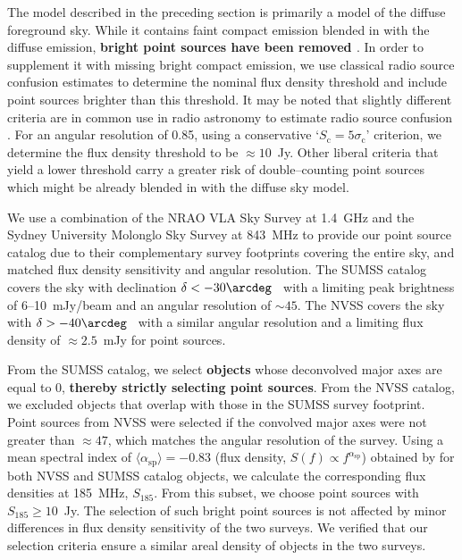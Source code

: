 \documentclass[preprint2,iop,numberedappendix]{emulateapj}
\begin{document}
The model described in the preceding section is primarily a model of the diffuse foreground sky. While it contains faint compact emission blended in with the diffuse emission, {\bf bright point sources have been removed \citep{deo08}}. In order to supplement it with missing bright compact emission, we use classical radio source confusion estimates to determine the nominal flux density threshold and include point sources brighter than this threshold. It may be noted that slightly different criteria are in common use in radio astronomy to estimate radio source confusion \citep[see Appendix of][and references therein]{thy13}. For an angular resolution of 0.85\arcdeg, using a conservative `$S_\textrm{c}=5\sigma_\textrm{c}$' criterion, we determine the flux density threshold to be $\approx 10$~Jy. Other liberal criteria that yield a lower threshold carry a greater risk of double--counting point sources which might be already blended in with the diffuse sky model. 

We use a combination of the NRAO VLA Sky Survey \citep[NVSS;][]{con98} at 1.4~GHz and the Sydney University Molonglo Sky Survey \citep[SUMSS;][]{boc99,mau03} at 843~MHz to provide our point source catalog due to their complementary survey footprints covering the entire sky, and matched flux density sensitivity and angular resolution. The SUMSS catalog covers the sky with declination $\delta < -30\arcdeg$~ with a limiting peak brightness of 6--10~mJy/beam and an angular resolution of $\sim 45$\arcsec. The NVSS covers the sky with $\delta > -40\arcdeg$~ with a similar angular resolution and a limiting flux density of $\approx 2.5$~mJy for point sources. 

From the SUMSS catalog, we select {\bf objects} whose deconvolved major axes are equal to 0\arcsec, {\bf thereby strictly selecting point sources}. From the NVSS catalog, we excluded objects that overlap with those in the SUMSS survey footprint. Point sources from NVSS were selected if the convolved major axes were not greater than $\approx 47$\arcsec, which matches the angular resolution of the survey. Using a mean spectral index of $\langle\alpha_\textrm{sp}\rangle=-0.83$ (flux density, $S(f)\propto f^{\alpha_\textrm{sp}}$) obtained by \citet{mau03} for both NVSS and SUMSS catalog objects, we calculate the corresponding flux densities at 185~MHz, $S_{185}$. From this subset, we choose point sources with $S_{185}\geq 10$~Jy. The selection of such bright point sources is not affected by minor differences in flux density sensitivity of the two surveys. We verified that our selection criteria ensure a similar areal density of objects in the two surveys. 
\end{document}
